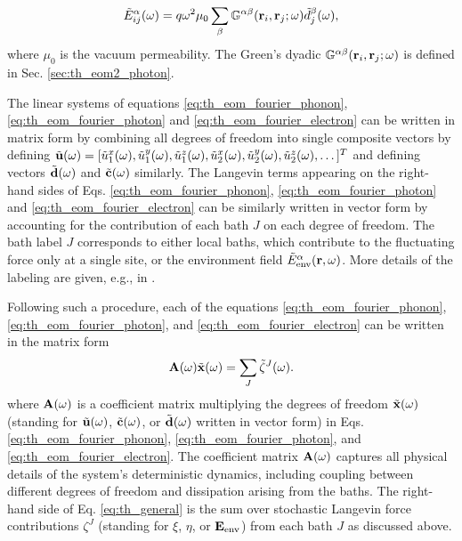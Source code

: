 \begin{equation}
 \tilde{E}_{ij}^{\alpha}(\omega) = q\omega^2 \mu_0 \sum_{\beta} \mathbb{G}^{\alpha\beta}(\mathbf{r}_i,\mathbf{r}_j;\omega)\tilde{d}_j^{\beta}(\omega), \label{eq:th_Eij}
\end{equation}
where $\mu_0$ is the vacuum permeability. The Green's dyadic $\mathbb{G}^{\alpha\beta}(\mathbf{r}_i,\mathbf{r}_j;\omega)$ is defined in Sec. \ref{sec:th_eom2_photon}. 

The linear systems of equations \eqref{eq:th_eom_fourier_phonon}, \eqref{eq:th_eom_fourier_photon} and \eqref{eq:th_eom_fourier_electron} can be written in matrix form by combining all degrees of freedom into single composite vectors by defining $\tilde{\mathbf{u}}(\omega)=[\tilde u_1^x(\omega),\tilde u_1^y(\omega),\tilde u_1^z(\omega),\tilde u_2^x(\omega),\tilde u_2^y(\omega),\tilde u_2^z(\omega),\dots]^T$ and defining vectors $\tilde{\mathbf{d}}(\omega)$ and $\tilde{\mathbf{c}}(\omega)$ similarly. The Langevin terms appearing on the right-hand sides of Eqs. \eqref{eq:th_eom_fourier_phonon}, \eqref{eq:th_eom_fourier_photon} and \eqref{eq:th_eom_fourier_electron} can be similarly written in vector form by accounting for the contribution of each bath $J$ on each degree of freedom. The bath label $J$ corresponds to either local baths, which contribute to the fluctuating force only at a single site, or the environment field $\tilde{E}_{\textrm{env}}^{\alpha}(\mathbf{r},\omega)$. More details of the labeling are given, e.g., in .

Following such a procedure, each of the equations \eqref{eq:th_eom_fourier_phonon}, \eqref{eq:th_eom_fourier_photon}, and \eqref{eq:th_eom_fourier_electron} can be written in the matrix form
\begin{equation}
 \mathbf{A}(\omega) \tilde{\mathbf{x}}(\omega) = \sum_J \tilde \zeta^J(\omega). \label{eq:th_general}
\end{equation}
where $\mathbf{A}(\omega)$ is a coefficient matrix multiplying the degrees of freedom $\tilde{\mathbf{x}}(\omega)$ (standing for $\tilde{\mathbf{u}}(\omega)$, $\tilde{\mathbf{c}}(\omega)$, or $\tilde{\mathbf{d}}(\omega)$ written in vector form) in Eqs. \eqref{eq:th_eom_fourier_phonon}, \eqref{eq:th_eom_fourier_photon}, and \eqref{eq:th_eom_fourier_electron}. The coefficient matrix $\mathbf{A}(\omega)$ captures all physical details of the system's deterministic dynamics, including coupling between different degrees of freedom and dissipation arising from the baths. The right-hand side of Eq. \eqref{eq:th_general} is the sum over stochastic Langevin force contributions $\zeta^J$ (standing for $\xi$, $\eta$, or $\mathbf{E}_{\textrm{env}}$) from each bath $J$ as discussed above.  

